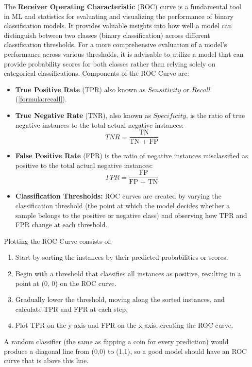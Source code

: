 The \textbf{Receiver Operating Characteristic} (ROC) curve  is a fundamental tool in ML and statistics for evaluating and visualizing the performance of binary classification models. 
It provides valuable insights into how well a model can distinguish between two classes (binary classification) across different classification thresholds.
For a more comprehensive evaluation of a model's performance across various thresholds, 
it is advisable to utilize a model that can provide probability scores for both classes rather than relying solely on categorical classifications.
Components of the ROC Curve are:

\begin{itemize}
  \item \textbf{True Positive Rate} (TPR) also known as $Sensitivity$ or $Recall$ (\ref{formula:recall}).
  
  \item \textbf{True Negative Rate} (TNR), also known as $Specificity$, is the ratio of true negative instances to the total actual negative instances:
  \begin{equation}
    \textit{TNR} = \frac{\text{TN}}{\text{TN + FP}}
    \label{formula:trueNegativeRate}
  \end{equation}

  \item \textbf{False Positive Rate} (FPR) is the ratio of negative instances misclassified as positive to the total actual negative instances:
  \begin{equation}
    \textit{FPR} = \frac{\text{FP}}{\text{FP + TN}}
    \label{formula:falsePositiveRate}
  \end{equation}

  \item \textbf{Classification Thresholds:} ROC curves are created by varying the classification threshold (the point at which the model decides whether a sample belongs to the positive or negative class) and observing how TPR and FPR change at each threshold.
\end{itemize}
Plotting the ROC Curve consists of:
\begin{enumerate}
  \item Start by sorting the instances by their predicted probabilities or scores.
  \item Begin with a threshold that classifies all instances as positive, resulting in a point at (0, 0) on the ROC curve.
  \item Gradually lower the threshold, moving along the sorted instances, and calculate TPR and FPR at each step.
  \item Plot TPR on the y-axis and FPR on the x-axis, creating the ROC curve.
\end{enumerate}
A random classifier (the same as flipping a coin for every prediction) would produce a diagonal line from (0,0) to (1,1), so a good model should have an ROC curve that is above this line.\\

